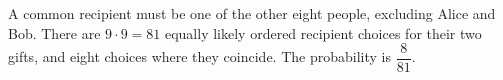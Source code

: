 A common recipient must be one of the other eight people, excluding Alice and Bob. There are $9\cdot9=81$ equally likely ordered recipient choices for their two gifts, and eight choices where they coincide. The probability is $\boxed{\dfrac{8}{81}}$.
